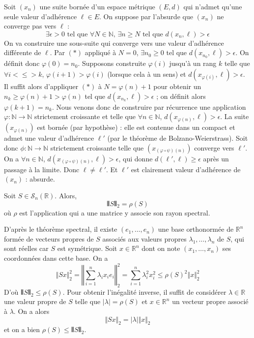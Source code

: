 	\begin{demonstration}
		Soit $(x_n)$ une suite bornée d'un espace métrique $(E, d)$ qui n'admet qu'une seule valeur d'adhérence $\ell \in E$. On suppose par l'absurde que $(x_n)$ ne converge pas vers $\ell$ :
		\[ \exists \epsilon > 0 \text{ tel que } \forall N \in \mathbb{N}, \, \exists n \geq N \text{ tel que } d(x_n, \ell) > \epsilon \tag{$*$} \]
		On va construire une sous-suite qui converge vers une valeur d'adhérence différente de $\ell$.
		\newpar
		Par $(*)$ appliqué à $N = 0$, $\exists n_0 \geq 0$ tel que $d(x_{n_0}, \ell) > \epsilon$. On définit donc $\varphi(0) = n_0$.
		\newpar
		Supposons construite $\varphi(i)$ jusqu'à un rang $k$ telle que $\forall i <\leq> k$, $\varphi(i+1) > \varphi(i)$ (lorsque cela à un sens) et $d(x_{\varphi(i)}, \ell) > \epsilon$. Il suffit alors d'appliquer $(*)$ à $N = \varphi(n) + 1$ pour obtenir un $n_k \geq \varphi(n) + 1 > \varphi(n)$ tel que $d(x_{n_k}, \ell) > \epsilon$ ; on définit alors $\varphi(k+1) = n_k$.
		\newpar
		Nous venons donc de construire par récurrence une application $\varphi : \mathbb{N} \rightarrow \mathbb{N}$ strictement croissante et telle que $\forall n \in \mathbb{N}$, $d(x_{\varphi(n)}, \ell) > \epsilon$. La suite $(x_{\varphi(n)})$ est bornée (par hypothèse) : elle est contenue dans un compact et admet une valeur d'adhérence $\ell'$ (par le théorème de Bolzano-Weierstrass). Soit donc $\phi : \mathbb{N} \rightarrow \mathbb{N}$ strictement croissante telle que $(x_{(\varphi \circ \psi)(n)})$ converge vers $\ell'$.
		\newpar
		On a $\forall n \in \mathbb{N}$, $d(x_{(\varphi \circ \psi)(n)}, \ell) > \epsilon$, qui donne $d(\ell', \ell) \geq \epsilon$ après un passage à la limite. Donc $\ell \neq \ell'$.	Et $\ell'$ est clairement valeur d'adhérence de $(x_n)$ : absurde.
	\end{demonstration}

	\reference{I-P}{182}

	\begin{lemma}
		\label{homeomorphisme-de-l-exponentielle-3}
		Soit $S \in \mathcal{S}_n(\mathbb{R})$. Alors,
		\[ \VERT S \VERT_2 = \rho(S) \]
		où $\rho$ est l'application qui a une matrice y associe son rayon spectral.
	\end{lemma}

	\begin{demonstration}
		D'après le théorème spectral, il existe $(e_1, \dots, e_n)$ une base orthonormée de $\mathbb{R}^n$ formée de vecteurs propres de $S$ associés aux valeurs propres $\lambda_1, \dots, \lambda_n$ de $S$, qui sont réelles car $S$ est symétrique. Soit $x \in \mathbb{R}^n$ dont on note $(x_1, \dots, x_n)$ ses coordonnées dans cette base. On a
		\[ \Vert Sx \Vert_2^2 = \left \Vert \sum_{i=1}^{n} \lambda_i x_i e_i \right \Vert_2^2 = \sum_{i=1}^n \lambda_i^2 x_i^2 \leq \rho(S)^2 \Vert x \Vert_2^2 \]
		D'où $\VERT S \VERT_2 \leq \rho(S)$. Pour obtenir l'inégalité inverse, il suffit de considérer $\lambda \in \mathbb{R}$ une valeur propre de $S$ telle que $|\lambda| = \rho(S)$ et $x \in \mathbb{R}^n$ un vecteur propre associé à $\lambda$. On a alors
		\[ \Vert Sx \Vert_2 = |\lambda| \Vert x \Vert_2 \]
		et on a bien $\rho(S) \leq \VERT S \VERT_2$.
	\end{demonstration}

